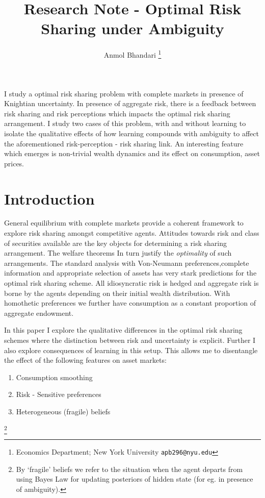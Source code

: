 \documentclass[12pt]{article}
\begin{document}




\title{Research Note  - Optimal Risk Sharing under Ambiguity}
\author{Anmol Bhandari \thanks{Economics Department; New York University \texttt{apb296@nyu.edu}}}
\maketitle
I study a optimal risk sharing problem with complete markets in presence of Knightian uncertainty. In presence of aggregate risk, there is a feedback between risk sharing and risk perceptions which impacts the optimal risk sharing arrangement. I study two cases of this problem, with and without learning to isolate the qualitative effects of how learning compounds with ambiguity to affect the aforementioned risk-perception - risk sharing link. An interesting feature which emerges is non-trivial wealth dynamics and its effect on consumption, asset prices.
\newpage

\section{Introduction}
\noindent General equilibrium with complete markets provide a coherent framework to explore risk sharing amongst competitive agents. Attitudes towards risk and class of securities available are the key objects for determining a risk sharing arrangement. The welfare theorems In turn justify the \emph{optimality} of such arrangements. The standard analysis with Von-Neumann preferences,complete information and appropriate selection of assets has very stark predictions for the optimal risk sharing scheme. All idiosyncratic risk is hedged and aggregate risk is borne by the agents depending on their initial wealth distribution. With homothetic preferences we further have consumption as a constant proportion of aggregate endowment. 

\noindent In this paper I explore the qualitative differences in the optimal risk sharing schemes where the distinction between risk and uncertainty is explicit. Further I also explore consequences of learning in this setup. This  allows me to disentangle the effect of the following features on asset markets:
\begin{enumerate}
	\item Consumption smoothing
	\item Risk - Sensitive preferences
	\item Heterogeneous (fragile) beliefs 
\end{enumerate} 
\footnote{By `fragile' beliefs we refer to the situation when the agent departs from using Bayes Law for updating posteriors of hidden state (for eg. in presence of ambiguity).}
\end{document}
